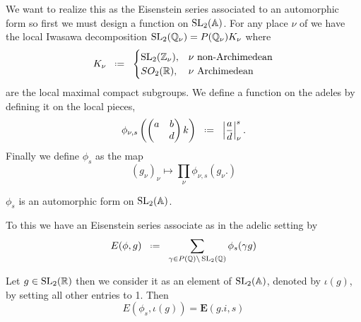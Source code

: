 We want to realize this as the Eisenstein series associated to an automorphic form so first we must design a function on \(\SL_2(\A)\). For any place \(\nu\) of \Q we have the local Iwasawa decomposition \(\SL_2(\Q_\nu) = P(\Q_\nu) K_\nu\) where 
\[K_\nu \defeq \begin{cases}
	\SL_2(\Z_\nu), & \nu \text{ non-Archimedean}\\
	SO_2(\R), & \nu \text{ Archimedean}
\end{cases}\]
 are the local maximal compact subgroups. We define a function on the adeles by defining it on the local pieces,
 \[\phi_{\nu, s}\left(\begin{pmatrix}
 	a & b\\ & d
 \end{pmatrix}k\right) \defeq \left| \frac{a}{d} \right|_\nu^s .\]
 Finally we define \(\phi_s\) as the map 
 \[(g_\nu)_{\nu} \mapsto \prod_\nu \phi_{\nu,s}(g_\nu.)\]
 
 \begin{Lemma}
 	\(\phi_s\) is an automorphic form on \(\SL_2(\A)\).
 \end{Lemma}
 
 To this we have an Eisenstein series associate as in the adelic setting by 
 \[E(\phi, g) \defeq \sum_{\gamma\in P(\Q)\backslash \SL_2(\Q)} \phi_s(\gamma g) \]

\begin{Lemma}
	Let \(g\in \SL_2(\R)\) then we consider it as an element of \(\SL_2(\A)\), denoted by \(\iota(g)\), by setting all other entries to 1. Then 
	\[E(\phi_s, \iota(g)) = \mathbf{E}(g.i,s)\]
\end{Lemma}





